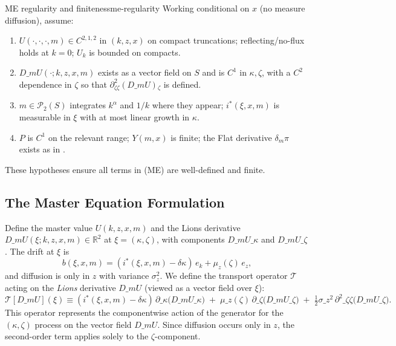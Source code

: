 ﻿\documentclass[11pt,letterpaper,oneside]{article}
\numberwithin{equation}{section}
\newcommand{\R}{\mathbb{R}}
\newcommand{\1}{\mathbf{1}}
\newcommand{\dmU}{D\_m U}
\newcommand{\Dm}{D\_m}
\begin{document}
\begin{assumption}{ME regularity and finiteness}{me-regularity}
Working conditional on $x$ (no measure diffusion), assume:
\begin{enumerate}[label=(\alph*),itemsep=0.2em]
  \item $U(\cdot,\cdot,\cdot, m)\in C^{2,1,2}$ in $(k,z,x)$ on compact truncations; reflecting/no-flux holds at $k=0$; $U_k$ is bounded on compacts.
  \item $\Dm U(\cdot; k,z,x,m)$ exists as a vector field on $S$ and is $C^1$ in $\kappa,\zeta$, with a $C^2$ dependence in $\zeta$ so that $\partial_{\zeta\zeta}^2(\Dm U)\!_{\zeta}$ is defined.
  \item $m\in\mathcal P_2(S)$ integrates $k^\alpha$ and $1/k$ where they appear; $i^*(\xi,x,m)$ is measurable in $\xi$ with at most linear growth in $\kappa$.
  \item $P$ is $C^1$ on the relevant range; $Y(m,x)$ is finite; the Flat derivative $\delta_m \pi$ exists as in .
\end{enumerate}
These hypotheses ensure all terms in (ME) are well-defined and finite.
\end{assumption}

\subsection{The Master Equation Formulation}\label{sec:me-formulation}

Define the master value $U(k,z,x,m)$ and the Lions derivative $\dmU(\xi;k,z,x,m)\in\R^2$ at $\xi=(\kappa,\zeta)$, with components $\dmU\_\kappa$ and $\dmU\_\zeta$. The drift at $\xi$ is
\[
b(\xi,x,m)=(i^*(\xi,x,m)-\delta\kappa)\,e_k+\mu_z(\zeta)\,e_z,
\]
and diffusion is only in $z$ with variance $\sigma_z^2$. We define the transport operator $\mathcal{T}$ acting on the \emph{Lions} derivative $\dmU$ (viewed as a vector field over $\xi$):
\[
\mathcal{T}[\dmU](\xi) \equiv (i^*(\xi,x,m)-\delta\kappa)\,\partial\_\kappa\big(\dmU\_\kappa\big)
\; +\; \mu\_z(\zeta)\,\partial\_\zeta\big(\dmU\_\zeta\big)
\; +\; \tfrac12\sigma\_z^2\,\partial^2\_{\zeta\zeta}\big(\dmU\_\zeta\big).
\]
This operator represents the componentwise action of the generator for the $(\kappa,\zeta)$ process on the vector field $\Dm U$. Since diffusion occurs only in $z$, the second-order term applies solely to the $\zeta$-component.
\end{document}

